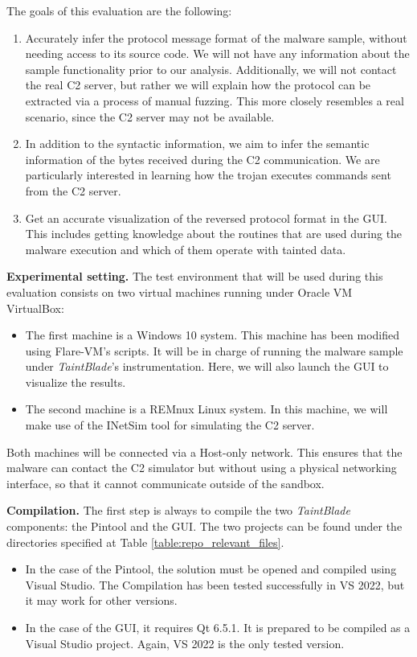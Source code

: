 \documentclass[conference]{IEEEtran}
\begin{document}
The goals of this evaluation are the following:
\begin{enumerate}
    \item Accurately infer the protocol message format of the malware sample, without needing access
    to its source code. We will not have any information about the sample functionality prior to our analysis.
    Additionally, we will not contact the real C2 server, but rather we will explain how the protocol can
    be extracted via a process of manual fuzzing. This more closely resembles a real scenario, since the C2 
    server may not be available.
    \item In addition to the syntactic information, we aim to infer the semantic information of the bytes
    received during the C2 communication. We are particularly interested in learning how the trojan executes 
    commands sent from the C2 server.
    \item Get an accurate visualization of the reversed protocol format in the GUI. This includes getting knowledge
    about the routines that are used during the malware execution and which of them operate with tainted data.
\end{enumerate}

\textbf{Experimental setting.}
The test environment that will be used during this evaluation consists on two virtual machines
running under Oracle VM VirtualBox\cite{virtualbox_page}:
\begin{itemize}
    \item The first machine is a Windows 10 system. This machine has been modified using Flare-VM's scripts\cite{flarevm}.
    It will be in charge of running the malware sample under \textit{TaintBlade}'s instrumentation. 
    Here, we will also launch the GUI to visualize the results.
    \item The second machine is a REMnux Linux system\cite{remnux}. In this machine, we will make use of 
    the INetSim tool for simulating the C2 server.
\end{itemize}
Both machines will be connected via a Host-only network. This ensures that the malware can contact the C2 simulator
but without using a physical networking interface, so that it cannot communicate outside of the sandbox.

\textbf{Compilation.}
The first step is always to compile the two \textit{TaintBlade} components: the Pintool and the GUI.
The two projects can be found under the directories specified at Table \ref{table:repo_relevant_files}.
\begin{itemize}
    \item In the case of the Pintool, the solution must be opened and compiled using Visual Studio. The Compilation
    has been tested successfully in VS 2022, but it may work for other versions.
    \item In the case of the GUI, it requires Qt 6.5.1. It is prepared to be compiled as a Visual Studio
    project. Again, VS 2022 is the only tested version.
\end{itemize}
\end{document}
